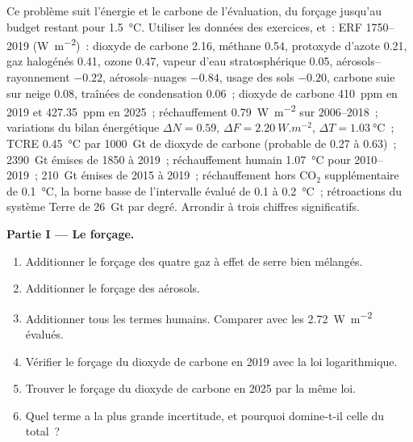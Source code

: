 \begin{problem}\label{pb:b2:anthropogenic-climate-change:1}
Ce problème suit l'énergie et le carbone de l'évaluation, du forçage jusqu'au budget restant pour
\qty{1.5}{\celsius}. Utiliser les données des exercices, et~: ERF 1750--2019 (\unit{W.m^{-2}})~: dioxyde
de carbone 2.16, méthane 0.54, protoxyde d'azote 0.21, gaz halogénés 0.41, ozone 0.47, vapeur d'eau
stratosphérique 0.05, aérosols--rayonnement $-0.22$, aérosols--nuages $-0.84$, usage des sols $-0.20$,
carbone suie sur neige 0.08, traînées de condensation 0.06~; dioxyde de carbone \qty{410}{ppm} en 2019
et \qty{427.35}{ppm} en 2025~; réchauffement \qty{0.79}{W.m^{-2}} sur 2006--2018~; variations du bilan
énergétique $\Delta N = 0.59$, $\Delta F = \qty{2.20}{W.m^{-2}}$, $\Delta T = \qty{1.03}{\celsius}$~;
TCRE \qty{0.45}{\celsius} par \qty{1000}{Gt} de dioxyde de carbone (probable de 0.27 à 0.63)~;
\qty{2390}{Gt} émises de 1850 à 2019~; réchauffement humain \qty{1.07}{\celsius} pour 2010--2019~;
\qty{210}{Gt} émises de 2015 à 2019~; réchauffement hors CO$_2$ supplémentaire de \qty{0.1}{\celsius},
la borne basse de l'intervalle évalué de 0.1 à \qty{0.2}{\celsius}~; rétroactions du système Terre de
\qty{26}{Gt} par degré. Arrondir à trois chiffres significatifs.

\noindent\textbf{Partie I --- Le forçage.}
\begin{enumerate}
  \item Additionner le forçage des quatre gaz à effet de serre bien mélangés.
  \item Additionner le forçage des aérosols.
  \item Additionner tous les termes humains. Comparer avec les \qty{2.72}{W.m^{-2}} évalués.
  \item Vérifier le forçage du dioxyde de carbone en 2019 avec la loi logarithmique.
  \item Trouver le forçage du dioxyde de carbone en 2025 par la même loi.
  \item Quel terme a la plus grande incertitude, et pourquoi domine-t-il celle du total~?
\end{enumerate}


\end{problem}
